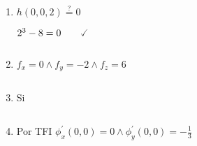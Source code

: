 \documentclass[../practica_04.tex]{subfiles}
\begin{document}
\begin{enumerate}
            \begin{enumerate}
                \item $ h(0,0,2) \stackrel{?}{=} 0 $

                    $ 2^3 - 8 = 0 \qquad\checked $

                    $ $

                \item $ f_x = 0 \wedge f_y = -2 \wedge f_z = 6 $

                    $ $

                \item Si

                    $ $

                \item Por TFI $ \phi_x^\prime(0,0) = 0 \wedge \phi_y^\prime(0,0) = -\frac{1}{3} $
            \end{enumerate}
    \end{enumerate}
\end{document}

